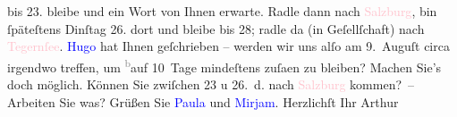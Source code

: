                bis 23. bleibe und ein Wort von Ihnen erwarte. Radle dann nach \textcolor{pink}{Salzburg}{}\ledrightnote{\textcolor{pink}{Salzburg}}, bin ſpäteſtens Dinſtag 26. dort
               und bleibe bis 28; radle da{\geminationn} (in Geſellſchaft) {\pb}nach \textcolor{pink}{Tegernſee}{}\ledrightnote{\textcolor{pink}{Tegernsee}}. \textcolor{blue}{Hugo}{}\ledrightnote{\textcolor{blue}{Hugo von Hofmannsthal}} hat Ihnen geſchrieben – werden wir uns alſo
               am 9. Auguſt circa irgendwo treffen, um \substVorne{}\textsuperscript{\textcolor{gray}{b}}\substDazwischen{}a\substHinten{}uf 10 Tage mindeſtens zuſa{\geminationm}en zu bleiben? Machen Sie’s doch möglich. Können Sie
               zwiſchen 23 u 26. d. nach \textcolor{pink}{Salzburg}{}\ledrightnote{\textcolor{pink}{Salzburg}} kommen? – Arbeiten Sie was?\pend
           \pstart
           Grüßen Sie \textcolor{blue}{Paula}{}\ledrightnote{\textcolor{blue}{Paula Beer-Hofmann}} und \textcolor{blue}{Mirjam}{}\ledrightnote{\textcolor{blue}{Mirjam Beer-Hofmann}}.\pend
           \pstart Herzlichſt Ihr \spacefill\mbox{Arthur}\pend{}\endnumbering{}  
      